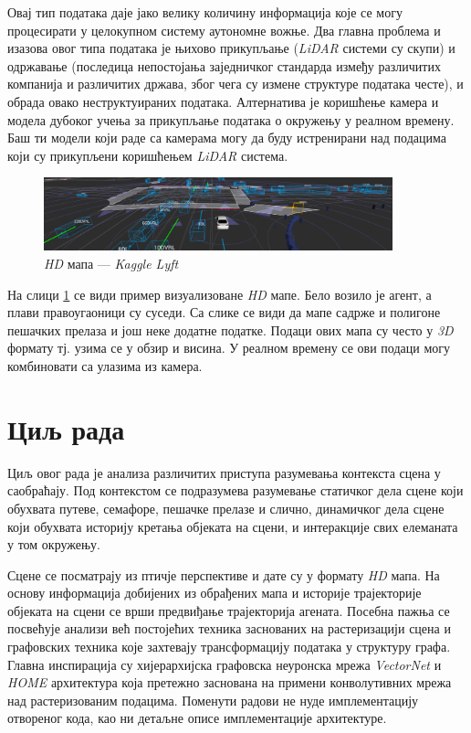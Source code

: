 \documentclass[11pt,oneside]{memoir}
\begin{document}
Овај тип података даје јако велику количину информација које се могу процесирати у целокупном систему аутономне вожње. Два главна проблема
и изазова овог типа података је њихово прикупљање (\textit{LiDAR} системи су скупи) и одржавање 
(последица непостојања заједничког стандарда између различитих компанија и различитих држава, због чега су измене структуре података честе), 
и обрада овако неструктуираних података. Алтернатива
је коришћење камера и модела дубоког учења за прикупљање података о окружењу у реалном времену. Баш ти модели који раде са
камерама могу да буду истренирани над подацима који су прикупљени коришћењем \textit{LiDAR} система.

\begin{figure}[H]
  \centering
  \includegraphics[width=0.9\textwidth]{images/lyft-hd-map.png}
  \caption{\textit{HD} мапа --- \textit{Kaggle Lyft} \cite{kaggle_lyft} \label{kaggle-lyft-example}}
\end{figure}

На слици \ref{kaggle-lyft-example} се види пример визуализоване \textit{HD} мапе. Бело возило је агент, а плави правоугаоници су суседи. 
Са слике се види да мапе садрже и полигоне пешачких прелаза и још неке додатне податке. Подаци ових мапа су често у \textit{3D} формату
тј. узима се у обзир и висина. У реалном времену се ови подаци могу комбиновати са улазима из камера. 

\section{Циљ рада}

Циљ овог рада је анализа различитих приступа разумевања контекста сцена у саобраћају. 
Под контекстом се подразумева разумевање статичког дела сцене који обухвата путеве,
семафоре, пешачке прелазе и слично, динамичког дела сцене који обухвата историју кретања објеката на сцени, и интеракције 
свих елеманата у том окружењу. 

Сцене се посматрају из птичје перспективе
и дате су у формату \textit{HD} мапа. На основу информација добијених из обрађених мапа и историје трајекторије објеката
на сцени се врши предвиђање трајекторија агената. Посебна пажња се посвећује анализи већ постојећих
техника заснованих на растеризацији сцена и графовских техника које захтевају трансформацију података у структуру графа. 
Главна инспирација су хијерархијска графовска неуронска мрежа \textit{VectorNet} \cite{vectornet} и \textit{HOME} \cite{home}
архитектура која претежно заснована на примени конволутивних мрежа над растеризованим подацима. Поменути радови не нуде
имплементацију отвореног кода, као ни детаљне описе имплементације архитектуре.
\end{document}
